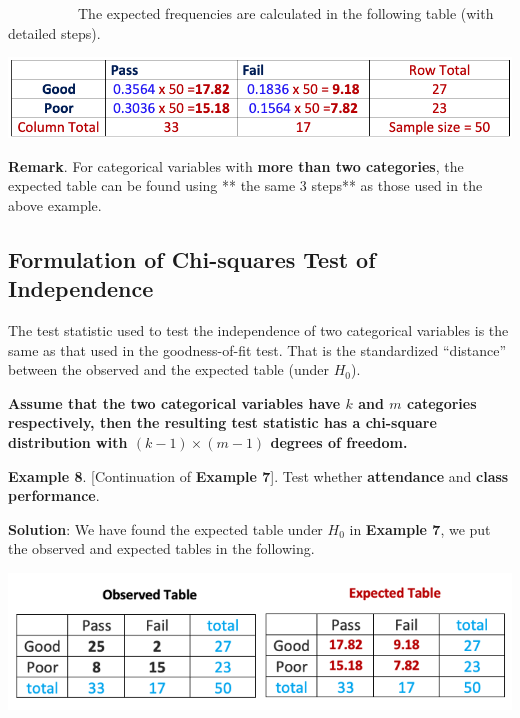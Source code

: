 \documentclass[
]{book}
\begin{document}
~~~~~~~~~~The expected frequencies are calculated in the following table (with detailed steps).

\begin{center}\includegraphics[width=0.65\linewidth]{week13/expectedTable} \end{center}

\hfill\break

\textbf{Remark}. For categorical variables with \textbf{more than two categories}, the expected table can be found using ** the same 3 steps** as those used in the above example.

\hfill\break

\hypertarget{formulation-of-chi-squares-test-of-independence}{%
\subsection{Formulation of Chi-squares Test of Independence}\label{formulation-of-chi-squares-test-of-independence}}

The test statistic used to test the independence of two categorical variables is the same as that used in the goodness-of-fit test. That is the standardized ``distance'' between the observed and the expected table (under \(H_0\)).

\textbf{Assume that the two categorical variables have \(k\) and \(m\) categories respectively, then the resulting test statistic has a chi-square distribution with \((k-1)\times(m-1)\) degrees of freedom.}

\textbf{Example 8}. {[}Continuation of \textbf{Example 7}{]}. Test whether \textbf{attendance} and \textbf{class performance}.

\textbf{Solution}: We have found the expected table under \(H_0\) in \textbf{Example 7}, we put the observed and expected tables in the following.

\begin{center}\includegraphics[width=0.7\linewidth]{week13/example08ExpObs} \end{center}
\end{document}

